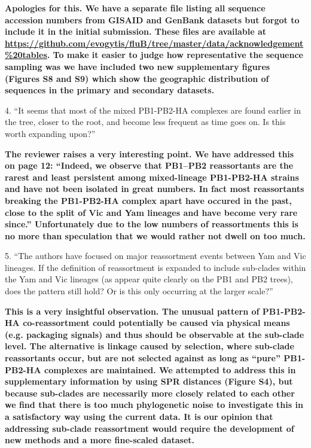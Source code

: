 \documentclass[11pt,oneside,letterpaper]{article}
\begin{document}
\textbf{Apologies for this. We have a separate file listing all sequence accession numbers from GISAID and GenBank datasets but forgot to include it in the initial submission.
These files are available at \url{https://github.com/evogytis/fluB/tree/master/data/acknowledgement\%20tables}.
To make it easier to judge how representative the sequence sampling was we have included two new supplementary figures (Figures S8 and S9) which show the geographic distribution of sequences in the primary and secondary datasets.}

4. ``It seems that most of the mixed PB1-PB2-HA complexes are found earlier in the tree, closer to the root, and become less frequent as time goes on.  Is this worth expanding upon?''

\textbf{The reviewer raises a very interesting point. We have addressed this on page 12: 
``Indeed, we observe that PB1--PB2 reassortants are the rarest and least persistent among mixed-lineage PB1-PB2-HA strains and have not been isolated in great numbers.
In fact most reassortants breaking the PB1-PB2-HA complex apart have occured in the past, close to the split of Vic and Yam lineages and have become very rare since.''
Unfortunately due to the low numbers of reassortments this is no more than speculation that we would rather not dwell on too much.}

5. ``The authors have focused on major reassortment events between Yam and Vic lineages.  
If the definition of reassortment is expanded to include sub-clades within the Yam and Vic lineages (as appear quite clearly on the PB1 and PB2 trees), does the pattern still hold?  
Or is this only occurring at the larger scale?''

\textbf{This is a very insightful observation. The unusual pattern of PB1-PB2-HA co-reassortment could potentially be caused via physical means (e.g. packaging signals) and thus should be observable at the sub-clade level.
The alternative is linkage caused by selection, where sub-clade reassortants occur, but are not selected against as long as ``pure'' PB1-PB2-HA complexes are maintained.
We attempted to address this in supplementary information by using SPR distances (Figure S4), but because sub-clades are necessarily more closely related to each other we find that there is too much phylogenetic noise to investigate this in a satisfactory way using the current data.
It is our opinion that addressing sub-clade reassortment would require the development of new methods and a more fine-scaled dataset.}
\end{document}
